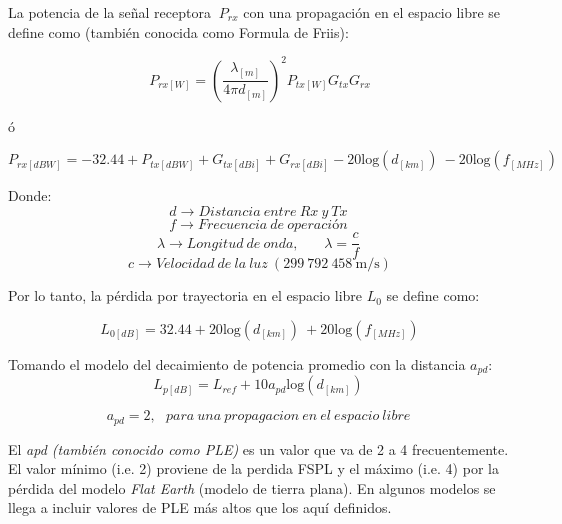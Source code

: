 La potencia de la señal receptora ${\ P}_{rx}$ con una propagación en el espacio libre se define como (también conocida como Formula de Friis):\newline

\begin{equation}
P_{rx\left[W\right]}={\left(\frac{{\lambda }_{[m]}}{4\pi d_{[m]}}\right)}^2P_{tx\left[W\right]}G_{tx}G_{rx}  
\label{eqn:Friis}
\end{equation}

ó\newline

\begin{equation}
P_{rx\left[dBW\right]}=-32.44+P_{tx\left[dBW\right]}+G_{tx\left[dBi\right]}+G_{rx\left[dBi\right]}-20{\mathrm{log} \left(d_{\left[km\right]}\right)\ }-20{\mathrm{log} \left(f_{\left[MHz\right]}\right)\ }
\label{eqn:Friss_dB}
\end{equation}

Donde:\newline
\[d\to Distancia\ entre\ Rx\ y\ Tx\ \] 
\[f\to Frecuencia\ de\ operaci\textrm{ó}n\ \] 
\[\lambda \to Longitud\ de\ onda,\ \ \ \ \ \ \ \ \lambda =\frac{c}{f}\ \] 
\[c\to Velocidad\ de\ la\ luz\ (\mathrm{299\ 792\ 458\ m/s})\] 

Por lo tanto, la pérdida por trayectoria en el espacio libre $L_0$ se define como:\newline

\begin{equation}
L_{0[dB]}=32.44+20{\mathrm{log} \left(d_{\left[km\right]}\right)\ }+20\mathrm{log}\mathrm{}(f_{[MHz]})
\label{eqn:L0}
\end{equation}

Tomando el modelo del decaimiento de potencia promedio con la distancia $a_{pd}$:\newline
\begin{equation}
L_{p[dB]}=L_{ref}+10a_{pd}{\mathrm{log} \left(d_{\left[km\right]}\right)\ }
\label{eqn:Lp_ref}
\end{equation}

\[a_{pd}=2,\ \ \ para\ una\ propagacion\ en\ el\ espacio\ libre\ \] 

El \textit{apd (también conocido como PLE)} es un valor que va de 2 a 4 frecuentemente. El valor mínimo (i.e. 2) proviene de la perdida FSPL y el máximo (i.e. 4) por la pérdida del modelo \textit{Flat Earth} (modelo de tierra plana). En algunos modelos se llega a incluir valores de PLE más altos que los aquí definidos.\newline


